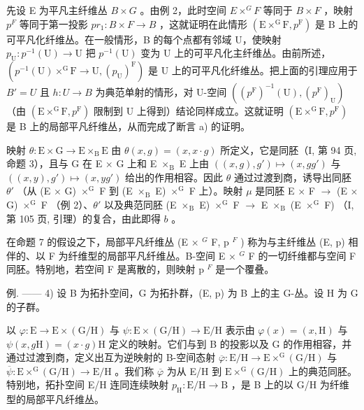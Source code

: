先设 E 为平凡主纤维丛 \(B \times G\) 。由例 2，此时空间 \(E \times^{G} F\) 等同于 \(B \times F\) ，映射 \(p^{F}\) 等同于第一投影 \(pr_{1}: B \times F \to B\) ，这就证明在此情形 \((\mathrm{E} \times^{\mathrm{G}}\mathrm{F}, p^{\mathrm{F}})\) 是 B 上的可平凡化纤维丛。在一般情形，B 的每个点都有邻域 U，使映射 \(p_{\mathrm{U}}: p^{-1}(\mathrm{U}) \to \mathrm{U}\) 把 \(p^{-1}(\mathrm{U})\) 变为 U 上的可平凡化主纤维丛。由前所述，\((p^{-1}(\mathrm{U}) \times^{\mathrm{G}}\mathrm{F} \to \mathrm{U}, (p_{\mathrm{U}})^{\mathrm{F}})\) 是 U 上的可平凡化纤维丛。把上面的引理应用于 \(B' = U\) 且 \(h: U \to B\) 为典范单射的情形，对 U-空间 \(((p^{\mathrm{F}})^{-1}(\mathrm{U}), (p^{\mathrm{F}})_{\mathrm{U}})\) （由 \((\mathrm{E} \times^{\mathrm{G}}\mathrm{F}, p^{\mathrm{F}})\) 限制到 U 上得到）结论同样成立。这就证明 \((\mathrm{E} \times^{\mathrm{G}}\mathrm{F}, p^{\mathrm{F}})\) 是 B 上的局部平凡纤维丛，从而完成了断言 a) 的证明。

映射 \(\theta\colon\mathrm{E}\times\mathrm{G}\to\mathrm{E}\times_{\mathrm{B}}\mathrm{E}\) 由 \(\theta(x,g)=(x,x\cdot g)\) 所定义，它是同胚（I, 第 94 页, 命题 3），且与 G 在 E \(\times\) G 上和 E \(\times_{\mathrm{B}}\) E 上由 \(((x,g),g')\mapsto(x,gg')\) 与 \(((x,y),g')\mapsto(x,yg')\) 给出的作用相容。因此 \(\theta\) 通过过渡到商，诱导出同胚 \(\theta'\) （从 (E \(\times\) G) \(\times^{\mathrm{G}}\) F 到 (E \(\times_{\mathrm{B}}\) E) \(\times^{\mathrm{G}}\) F 上）。映射 \(\mu\) 是同胚 E \(\times\) F \(\rightarrow\) (E \(\times\) G) \(\times^{\mathrm{G}}\) F （例 2）、\(\theta'\) 以及典范同胚 (E \(\times_{\mathrm{B}}\) E) \(\times^{\mathrm{G}}\) F \(\rightarrow\) E \(\times_{\mathrm{B}}\) (E \(\times^{\mathrm{G}}\) F) （I, 第 105 页, 引理）的复合，由此即得 \(b\) 。

在命题 7 的假设之下，局部平凡纤维丛 (E × \(^{G}\) F, p \(^{F}\) ) 称为与主纤维丛 (E, p) 相伴的、以 F 为纤维型的局部平凡纤维丛。B-空间 E × \(^{G}\) F 的一切纤维都与空间 F 同胚。特别地，若空间 F 是离散的，则映射 p \(^{F}\) 是一个覆叠。

例. —— 4) 设 B 为拓扑空间，G 为拓扑群，(E, p) 为 B 上的主 G-丛。设 H 为 G 的子群。

以 \(\varphi\colon\mathrm{E}\to\mathrm{E}\times(\mathrm{G}/\mathrm{H})\) 与 \(\psi\colon\mathrm{E}\times(\mathrm{G}/\mathrm{H})\to\mathrm{E}/\mathrm{H}\) 表示由 \(\varphi(x)=(x,\mathrm{H})\) 与 \(\psi(x,g\mathrm{H})=(x\cdot g)\mathrm{H}\) 定义的映射。它们与到 B 的投影以及 G 的作用相容，并通过过渡到商，定义出互为逆映射的 B-空间态射 \(\overline{\varphi}\colon\mathrm{E}/\mathrm{H}\to\mathrm{E}\times^{\mathrm{G}}(\mathrm{G}/\mathrm{H})\) 与 \(\overline{\psi}\colon\mathrm{E}\times^{\mathrm{G}}(\mathrm{G}/\mathrm{H})\to\mathrm{E}/\mathrm{H}\) 。我们称 \(\overline{\varphi}\) 为从 E/H 到 \(\mathrm{E}\times^{\mathrm{G}}(\mathrm{G}/\mathrm{H})\) 上的典范同胚。特别地，拓扑空间 E/H 连同连续映射 \(p_{\mathrm{H}}\colon\mathrm{E}/\mathrm{H}\to\mathrm{B}\) ，是 B 上的以 G/H 为纤维型的局部平凡纤维丛。

